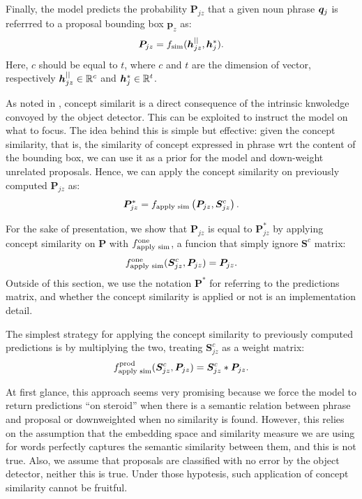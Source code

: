 Finally, the model predicts the probability $\bm{P}_{jz}$ that a given
noun phrase $\bm{q}_j$ is referrred to a proposal bounding box $\bm{p}_z$
as:
\begin{equation}
  \bm{P}_{jz} = f_{\text{sim}} ( \bm{h}^{||}_{jz} , \bm{h}^*_j ).
\end{equation}
Here, $c$ should be equal to $t$, where $c$ and $t$ are the dimension of vector,
respectively $\bm{h}^{||}_{jz} \in \mathbb{R}^c$ and $\bm{h}^*_j \in
\mathbb{R}^t$.

As noted in , concept similarit is a direct
consequence of the intrinsic knwoledge convoyed by the object
detector. This can be exploited to instruct the model on what to
focus. The idea behind this is simple but effective: given the concept
similarity, that is, the similarity of concept expressed in phrase wrt
the content of the bounding box, we can use it as a prior for the
model and down-weight unrelated proposals. Hence, we can apply the
concept similarity on previously computed $\bm{P}_{jz}$ as:
\begin{equation}
  \bm{P}^*_{jz} = f_{\text{apply sim}} \left( \bm{P}_{jz} , \bm{S}^c_{jz} \right).
\end{equation}

For the sake of presentation, we show that $\bm{P}_{jz}$ is equal to
$\bm{P}^*_{jz}$ by applying concept similarity on $\bm{P}$ with
$f_{\text{apply sim}}^{\text{one}}$, a funcion that simply ignore $\bm{S}^c$
matrix:
\begin{equation}
  f_{\text{apply sim}}^{\text{one}} (\bm{S}^c_{jz}, \bm{P}_{jz}) = \bm{P}_{jz}.
\end{equation}
Outside of this section, we use the notation $\bm{P}^*$ for referring
to the predictions matrix, and whether the concept similarity is
applied or not is an implementation detail.

The simplest strategy for applying the concept similarity to
previously computed predictions is by multiplying the two, treating
$\bm{S}^c_{jz}$ as a weight matrix:
\begin{equation}
  f_{\text{apply sim}}^{\text{prod}} (\bm{S}^c_{jz}, \bm{P}_{jz}) = \bm{S}^c_{jz} * \bm{P}_{jz}.
\end{equation}

At first glance, this approach seems very promising because we force
the model to return predictions ``on steroid'' when there is a
semantic relation between phrase and proposal or downweighted when no
similarity is found. However, this relies on the assumption that the
embedding space and similarity measure we are using for words
perfectly captures the semantic similarity between them, and this is
not true. Also, we assume that proposals are classified with no error
by the object detector, neither this is true. Under those hypotesis,
such application of concept similarity cannot be fruitful. 

